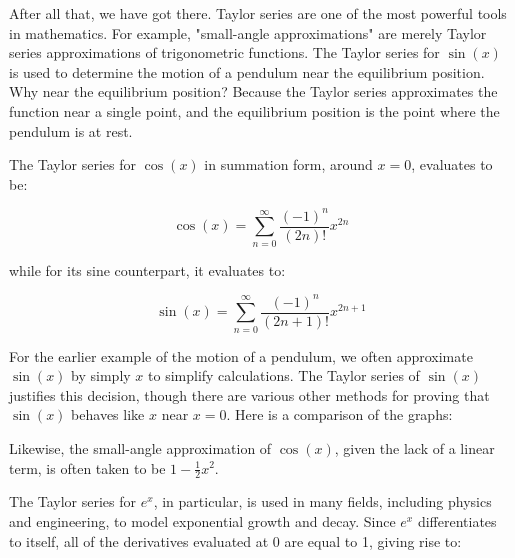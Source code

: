 \documentclass{article}
\begin{document}
After all that, we have got there. Taylor series are one of the most powerful tools in mathematics. For example, "small-angle approximations" are merely Taylor series approximations of trigonometric functions. The Taylor series for $\sin(x)$ is used to determine the motion of a pendulum near the equilibrium position. Why near the equilibrium position? Because the Taylor series approximates the function near a single point, and the equilibrium position is the point where the pendulum is at rest.

The Taylor series for $\cos(x)$ in summation form, around $x=0$, evaluates to be:

$$
\cos(x) = \sum_{n=0}^{\infty} \frac{(-1)^n}{(2n)!} x^{2n}
$$

while for its sine counterpart, it evaluates to:

$$
\sin(x) = \sum_{n=0}^{\infty} \frac{(-1)^n}{(2n+1)!} x^{2n+1}
$$

For the earlier example of the motion of a pendulum, we often approximate $\sin(x)$ by simply $x$ to simplify calculations. The Taylor series of $\sin(x)$ justifies this decision, though there are various other methods for proving that $\sin(x)$ behaves like $x$ near $x=0$. Here is a comparison of the graphs:

\begin{center}
\end{center}

Likewise, the small-angle approximation of $\cos(x)$, given the lack of a linear term, is often taken to be $1 - \frac{1}{2}x^2$.

The Taylor series for $e^x$, in particular, is used in many fields, including physics and engineering, to model exponential growth and decay. Since $e^x$ differentiates to itself, all of the derivatives evaluated at 0 are equal to 1, giving rise to:
\end{document}
